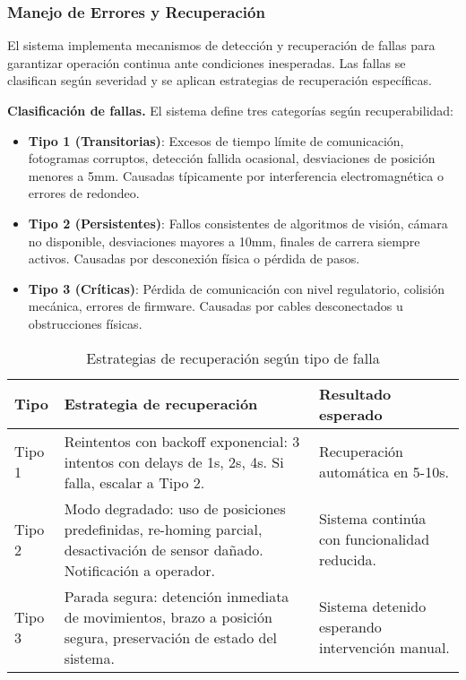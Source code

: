 \subsubsection{Manejo de Errores y Recuperación}

El sistema implementa mecanismos de detección y recuperación de fallas para garantizar operación continua ante condiciones inesperadas. Las fallas se clasifican según severidad y se aplican estrategias de recuperación específicas.

\textbf{Clasificación de fallas.} El sistema define tres categorías según recuperabilidad:

\begin{itemize}
    \item \textbf{Tipo 1 (Transitorias)}: Excesos de tiempo límite de comunicación, fotogramas corruptos, detección fallida ocasional, desviaciones de posición menores a 5mm. Causadas típicamente por interferencia electromagnética o errores de redondeo.

    \item \textbf{Tipo 2 (Persistentes)}: Fallos consistentes de algoritmos de visión, cámara no disponible, desviaciones mayores a 10mm, finales de carrera siempre activos. Causadas por desconexión física o pérdida de pasos.

    \item \textbf{Tipo 3 (Críticas)}: Pérdida de comunicación con nivel regulatorio, colisión mecánica, errores de firmware. Causadas por cables desconectados u obstrucciones físicas.
\end{itemize}

\begin{table}[H]
\centering
\small
\begin{tabular}{|l|p{5.5cm}|p{5.5cm}|}
\hline
\textbf{Tipo} & \textbf{Estrategia de recuperación} & \textbf{Resultado esperado} \\
\hline
Tipo 1 & Reintentos con backoff exponencial: 3 intentos con delays de 1s, 2s, 4s. Si falla, escalar a Tipo 2. & Recuperación automática en 5-10s. \\
\hline
Tipo 2 & Modo degradado: uso de posiciones predefinidas, re-homing parcial, desactivación de sensor dañado. Notificación a operador. & Sistema continúa con funcionalidad reducida. \\
\hline
Tipo 3 & Parada segura: detención inmediata de movimientos, brazo a posición segura, preservación de estado del sistema. & Sistema detenido esperando intervención manual. \\
\hline
\end{tabular}
\caption{Estrategias de recuperación según tipo de falla}
\label{tab:estrategias_recuperacion}
\end{table}

